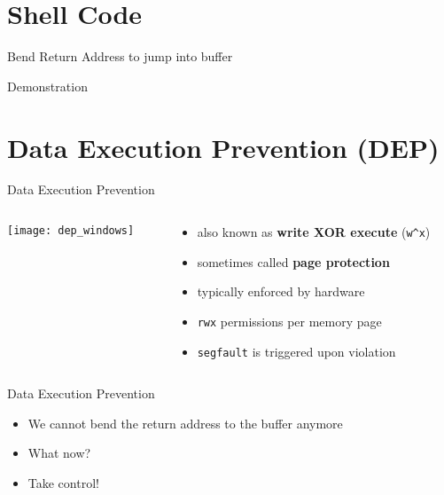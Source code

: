 \documentclass[beamer]{uibk}
\begin{document}
\section{Shell Code}

\begin{frame}{Bend Return Address to jump into buffer}
    \begin{center}
        \huge Demonstration
    \end{center}
\end{frame}

\section{Data Execution Prevention (DEP)}

\begin{frame}{Data Execution Prevention}
    \begin{columns}
        \begin{column}{0.5\textwidth}
            \begin{center}
                \texttt{[image: dep\_windows]}
            \end{center}
        \end{column}
        \begin{column}{0.5\textwidth}
            \begin{itemize}
                \item also known as \textbf{write XOR execute} (\texttt{w\^{}x})
                \medskip
                \item sometimes called \textbf{page protection}
                \bigskip
                \item typically enforced by hardware
                \medskip
                \item \texttt{rwx} permissions per memory page
                \medskip
                \item \texttt{segfault} is triggered upon violation
            \end{itemize}
        \end{column}
    \end{columns}
\end{frame}

\begin{frame}{Data Execution Prevention}
    \begin{itemize}
        \item We cannot bend the return address to the buffer anymore
        \item What now?
        \bigskip
        \pause
        \item Take control!
    \end{itemize}
\end{frame}
\end{document}
